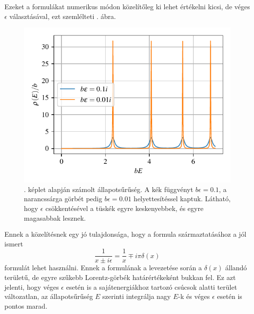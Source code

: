 Ezeket a formulákat numerikus módon közelítőleg ki lehet értékelni kicsi, de véges $\epsilon$ választásával, ezt szemlélteti . ábra.
\begin{figure}[H]
	\centering
	\includegraphics[scale=1]{./figs/dosfromgreen.pdf}
	\caption[Állapotsűrűség]{. képlet alapján számolt állapotsűrűség. A kék függvényt $b\epsilon = 0.1$, a narancssárga görbét pedig $b\epsilon = 0.01$ helyettesítéssel kaptuk. Látható, hogy $\epsilon$ csökkentésével a tüskék egyre keskenyebbek, és egyre magasabbak lesznek.}
	\label{green:állapotsűrség}
\end{figure}
Ennek a közelítésnek egy jó tulajdonsága, hogy a formula származtatásához a jól ismert
\begin{equation}
	\frac{1}{x\pm i\epsilon} = \frac{1}{x}\mp i\pi\delta(x)
\end{equation}
formulát lehet használni. Ennek a formulának a levezetése során a $\delta(x)$ állandó területű, de egyre szűkebb Lorentz-görbék határértékeként bukkan fel. Ez azt jelenti, hogy véges $\epsilon$ esetén is a sajátenergiákhoz tartozó csúcsok alatti terület változatlan, az állapotsűrűség $E$ szerinti integrálja nagy $E$-k és véges $\epsilon$ esetén is pontos marad.
